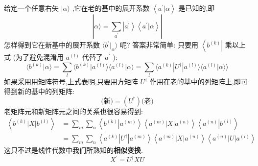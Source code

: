 \documentclass[lang=cn,newtx,10pt,scheme=chinese,thmcnt=section]{elegantbook}
\begin{document}
给定一个任意右矢 $|\alpha \rangle$ ,它在老的基中的展开系数 $\left\langle {{a}^{\prime } | \alpha }\right\rangle$ 是已知的,即
\begin{equation}
	| {\alpha \rangle = \mathop{\sum }\limits_{{a}^{\prime }}\left| {a}^{\prime }\right\rangle \left\langle {{a}^{\prime } | \alpha }\right\rangle }|
\end{equation}
怎样得到它在新基中的展开系数 $\langle {{b}^{\prime }| }_{\alpha }\rangle$ 呢? 答案非常简单: 只要用 $\left\langle {b}^{\left( k\right) }\right|$ 乘以上式 (为了避免混淆用 ${a}^{\left( l\right) }$ 代替了 ${a}^{\prime }$ ):
\begin{equation}
	\langle {{b}^{\left( k\right) } | \alpha }\rangle = \mathop{\sum }\limits_{l}\langle {{b}^{\left( k\right) }| {a}^{\left( l\right) }\rangle \langle {{a}^{\left( l\right) } | \alpha }\rangle = \mathop{\sum }\limits_{l}\langle {{a}^{\left( k\right) }| {U}^{ \dagger }| {a}^{\left( l\right) }}\rangle \langle {{a}^{\left( l\right) } | \alpha }\rangle}\rangle
\end{equation}
如果采用用矩阵符号,上式表明,只要用方矩阵 ${U}^{ \dagger }$ 作用在老的基中的列矩阵上,即可得到新的基中的列矩阵:
\begin{equation}
	\text{(新)} = ( {U}^{ \dagger }) \text{(老)}
\end{equation}
老矩阵元和新矩阵元之间的关系也很容易得到:
\begin{equation}
	\begin{aligned}
	\left\langle {{b}^{\left( k\right) }\left| X\right| {b}^{\left( l\right) }}\right\rangle &= \mathop{\sum }\limits_{m}\mathop{\sum }\limits_{n}\left\langle {{b}^{\left( k\right) }\left| {a}^{\left( m\right) }\right\rangle \left\langle {{a}^{\left( m\right) }\left| X\right| {a}^{\left( n\right) }}\right\rangle \left\langle {a}^{\left( n\right) }\right| {b}^{\left( l\right) }}\right\rangle\\
	&= \mathop{\sum }\limits_{m}\mathop{\sum }\limits_{n}\left\langle {{a}^{\left( k\right) }\left| {U}^{ \dagger }\right| {a}^{\left( m\right) }}\right\rangle \left\langle {{a}^{\left( m\right) }\left| X\right| {a}^{\left( n\right) }}\right\rangle \left\langle {{a}^{\left( n\right) }\left| U\right| {a}^{\left( l\right) }}\right\rangle
	\end{aligned}
\end{equation}
这只不过是线性代数中我们所熟知的\textbf{相似变换}.
\begin{equation}
	{X}^{\prime } = {U}^{ \dagger }{XU}
\end{equation}
\end{document}
